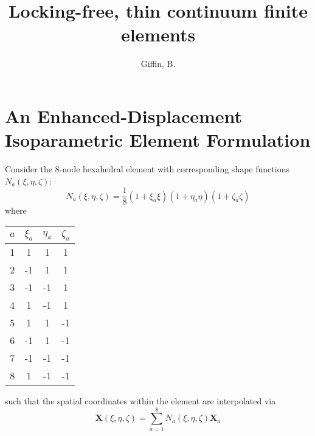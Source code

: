 \documentclass[11pt]{article} %
\title{\textbf{Locking-free, thin continuum finite elements}}
\author{Giffin, B.}
\begin{document}
\maketitle

\section{An Enhanced-Displacement Isoparametric Element Formulation}

Consider the 8-node hexahedral element with corresponding shape functions $N_a (\xi,\eta,\zeta)$:
\begin{equation}
	N_a (\xi,\eta,\zeta) = \frac{1}{8} (1 + \xi_a \xi) (1 + \eta_a \eta) (1 + \zeta_a \zeta)
\end{equation}
where
\begin{center}
\begin{tabular}{ cccc }
	$a$ & $\xi_a$ & $\eta_a$ & $\zeta_a$ \\
	\hline
	1 & 1 & 1 & 1 \\
	2 & -1 & 1 & 1 \\
	3 & -1 & -1 & 1 \\
	4 & 1 & -1 & 1 \\
	5 & 1 & 1 & -1 \\
	6 & -1 & 1 & -1 \\
	7 & -1 & -1 & -1 \\
	8 & 1 & -1 & -1
\end{tabular}
\end{center}
such that the spatial coordinates within the element are interpolated via
\begin{equation}
	\mathbf{X}(\xi,\eta,\zeta) = \sum_{a = 1}^8 N_a (\xi,\eta,\zeta) \mathbf{X}_a
\end{equation}
\end{document}
